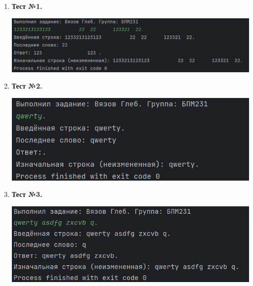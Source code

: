 \documentclass[12pt]{article}
\begin{document}
\begin{enumerate}

\item \textbf{Тест №1.}

\includegraphics[width=1\textwidth]{img1}



\item \textbf{Тест №2.}

\includegraphics[width=1\textwidth]{img2}



\item \textbf{Тест №3.}

\includegraphics[width=1\textwidth]{img3}


\end{enumerate}
\end{document}
